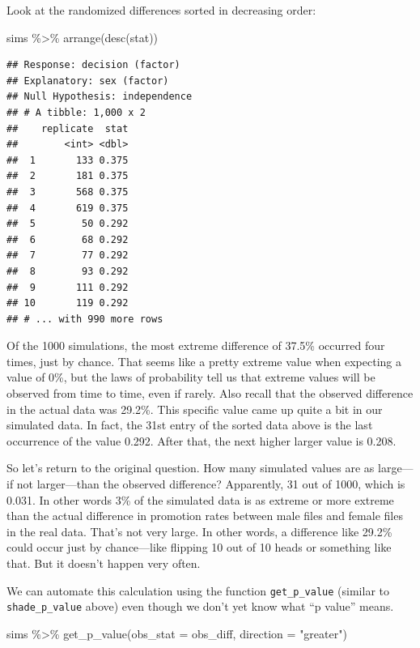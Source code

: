 \documentclass[
]{book}
\newenvironment{Shaded}{\begin{snugshade}}{\end{snugshade}}
\newcommand{\AttributeTok}[1]{\textcolor[rgb]{0.77,0.63,0.00}{#1}}
\newcommand{\FunctionTok}[1]{\textcolor[rgb]{0.00,0.00,0.00}{#1}}
\newcommand{\NormalTok}[1]{#1}
\newcommand{\SpecialCharTok}[1]{\textcolor[rgb]{0.00,0.00,0.00}{#1}}
\newcommand{\StringTok}[1]{\textcolor[rgb]{0.31,0.60,0.02}{#1}}
\begin{document}
Look at the randomized differences sorted in decreasing order:

\begin{Shaded}
\begin{Highlighting}[]
\NormalTok{sims }\SpecialCharTok{\%\textgreater{}\%}
    \FunctionTok{arrange}\NormalTok{(}\FunctionTok{desc}\NormalTok{(stat))}
\end{Highlighting}
\end{Shaded}

\begin{verbatim}
## Response: decision (factor)
## Explanatory: sex (factor)
## Null Hypothesis: independence
## # A tibble: 1,000 x 2
##    replicate  stat
##        <int> <dbl>
##  1       133 0.375
##  2       181 0.375
##  3       568 0.375
##  4       619 0.375
##  5        50 0.292
##  6        68 0.292
##  7        77 0.292
##  8        93 0.292
##  9       111 0.292
## 10       119 0.292
## # ... with 990 more rows
\end{verbatim}

Of the 1000 simulations, the most extreme difference of 37.5\% occurred four times, just by chance. That seems like a pretty extreme value when expecting a value of 0\%, but the laws of probability tell us that extreme values will be observed from time to time, even if rarely. Also recall that the observed difference in the actual data was 29.2\%. This specific value came up quite a bit in our simulated data. In fact, the 31st entry of the sorted data above is the last occurrence of the value 0.292. After that, the next higher larger value is 0.208.

So let's return to the original question. How many simulated values are as large---if not larger---than the observed difference? Apparently, 31 out of 1000, which is 0.031. In other words 3\% of the simulated data is as extreme or more extreme than the actual difference in promotion rates between male files and female files in the real data. That's not very large. In other words, a difference like 29.2\% could occur just by chance---like flipping 10 out of 10 heads or something like that. But it doesn't happen very often.

We can automate this calculation using the function \texttt{get\_p\_value} (similar to \texttt{shade\_p\_value} above) even though we don't yet know what ``p value'' means.

\begin{Shaded}
\begin{Highlighting}[]
\NormalTok{sims }\SpecialCharTok{\%\textgreater{}\%}
    \FunctionTok{get\_p\_value}\NormalTok{(}\AttributeTok{obs\_stat =}\NormalTok{ obs\_diff, }\AttributeTok{direction =} \StringTok{"greater"}\NormalTok{)}
\end{Highlighting}
\end{Shaded}
\end{document}

